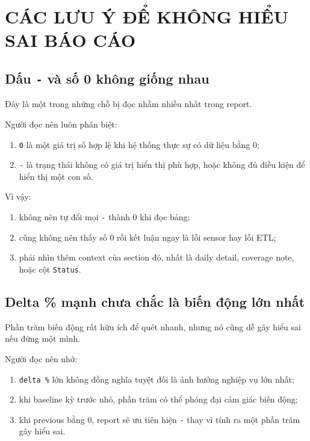 \chapter{CÁC LƯU Ý ĐỂ KHÔNG HIỂU SAI BÁO CÁO}

\section{Dấu \texttt{-} và số 0 không giống nhau}

Đây là một trong những chỗ bị đọc nhầm nhiều nhất trong report.

Người đọc nên luôn phân biệt:

\begin{enumerate}[label=-]
\item \texttt{0} là một giá trị số hợp lệ khi hệ thống thực sự có dữ liệu bằng 0;
\item \texttt{-} là trạng thái không có giá trị hiển thị phù hợp, hoặc không đủ điều kiện để hiển thị một con số.
\end{enumerate}

Vì vậy:

\begin{enumerate}[label=-]
\item không nên tự đổi mọi \texttt{-} thành 0 khi đọc bảng;
\item cũng không nên thấy số 0 rồi kết luận ngay là lỗi sensor hay lỗi ETL;
\item phải nhìn thêm context của section đó, nhất là daily detail, coverage note, hoặc cột \texttt{Status}.
\end{enumerate}

\section{Delta \% mạnh chưa chắc là biến động lớn nhất}

Phần trăm biến động rất hữu ích để quét nhanh, nhưng nó cũng dễ gây hiểu sai nếu đứng một mình.

Người đọc nên nhớ:

\begin{enumerate}[label=-]
\item \texttt{delta \%} lớn không đồng nghĩa tuyệt đối là ảnh hưởng nghiệp vụ lớn nhất;
\item khi baseline kỳ trước nhỏ, phần trăm có thể phóng đại cảm giác biến động;
\item khi previous bằng 0, report sẽ ưu tiên hiện \texttt{-} thay vì tính ra một phần trăm gây hiểu sai.
\end{enumerate}


